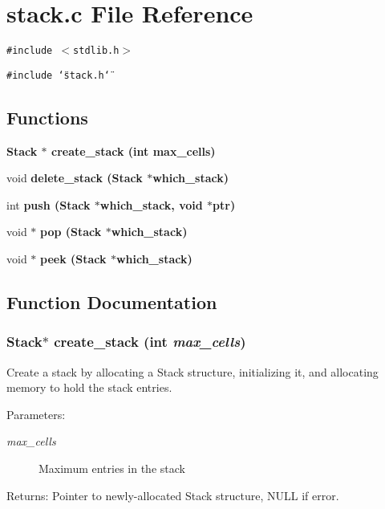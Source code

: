 \section{stack.c File Reference}
\label{stack_8c}
{\tt \#include $<$stdlib.h$>$}\par
{\tt \#include \char`\"{}stack.h\char`\"{}}\par
\subsection*{Functions}
\begin{CompactItemize}
\item 
\bf{Stack} $\ast$ \bf{create\_\-stack} (int max\_\-cells)
\item 
void \bf{delete\_\-stack} (\bf{Stack} $\ast$which\_\-stack)
\item 
int \bf{push} (\bf{Stack} $\ast$which\_\-stack, void $\ast$ptr)
\item 
void $\ast$ \bf{pop} (\bf{Stack} $\ast$which\_\-stack)
\item 
void $\ast$ \bf{peek} (\bf{Stack} $\ast$which\_\-stack)
\end{CompactItemize}


\subsection{Function Documentation}
\subsubsection{\setlength{\rightskip}{0pt plus 5cm}\bf{Stack}$\ast$ create\_\-stack (int {\em max\_\-cells})}\label{stack_8c_95307d53d00d64c88d94459933faab55}


Create a stack by allocating a Stack structure, initializing it, and allocating memory to hold the stack entries. \begin{Desc}
\item[Parameters:]
\begin{description}
\item[{\em max\_\-cells}]Maximum entries in the stack \end{description}
\end{Desc}
\begin{Desc}
\item[Returns:]Pointer to newly-allocated Stack structure, NULL if error. \end{Desc}
